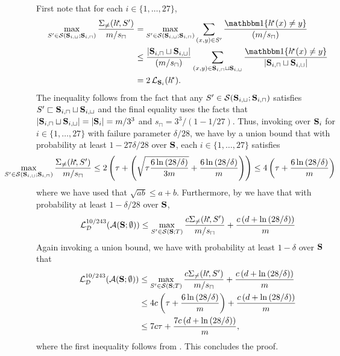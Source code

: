 \begin{proofof}{}
First note that for each $i \in\{ 1,\ldots,27\}$, 
\begin{align*}
\max\limits_{S'\in \cS(\rS_{i,\sqcup}; \rS_{i,\sqcap})} \frac{\Sigma_{\not=}(\hs\negmedspace,S')}{m/s_{\sqcap}} & =\max\limits_{S'\in \cS(\rS_{i,\sqcup};\rS_{i,\sqcap})} \sum\limits_{(x,y)\in S'}\frac{\ind\{ \hs(x)\not=y \}}{(m/s_{\sqcap})} \\
&\leq \frac{|\rS_{i,\sqcap}\sqcup\rS_{i,\sqcup}|}{(m/s_{\sqcap})}
\sum_{(x,y)\in \rS_{i,\sqcap}\sqcup\rS_{i,\sqcup}}\frac{\ind\{ \hs(x)\not=y \}}{|\rS_{i,\sqcap}\sqcup  \rS_{i,\sqcup}|} \\ 
&= 2\ls_{\rS_{i}}(\hs). 
\end{align*}
The inequality follows from the fact that any $S'\in \mathcal{S}(\mathbf{S}_{i,\sqcup};\mathbf{S}_{i,\sqcap})$ satisfies $S'\sqsubset \mathbf{S}_{i,\sqcap}\sqcup \mathbf{S}_{i,\sqcup}$ and the final equality uses the facts that $ |\mathbf{S}_{i,\sqcap}\sqcup\mathbf{S}_{i,\sqcup}|=|\mathbf{S}_{i}|=m/3^{3}$ and $ s_{\sqcap}=3^{3}/(1-1/27) $.  
Thus, invoking  over $\mathbf{S}_{i}  $ for $ i\in\{  1,\ldots,27\}  $ with failure parameter $  \delta/28$, we have by a union bound that with probability at least $ 1-27\delta/28 $ over $ \mathbf{S} $, each $ i\in\{  1,\ldots,27\}$ satisfies
\begin{align}\label{eq:upperboundlem1}
\hspace{-1.5 cm}
    \max\limits_{S'\in \cS(\rS_{i,\sqcup};\rS_{i,\sqcap})}\frac{\Sigma_{\not=}(\hs\negmedspace,S')}{m/s_{\sqcap}}
 \leq  
2
 \left(
    \tau+
 \left(\sqrt{\tau\frac{6\ln{(28/\delta )}}{3m}}
 +\frac{6\ln{(28/\delta )}}{m}\right)
 \right)\leq 4 \left(
    \tau+\frac{6\ln{(28/\delta )}}{m}\right)
\end{align}
where we have used that $ \sqrt{ab}\leq a+b.$ 
Furthermore, by  we have that with probability at least $ 1-\delta/28 $ over $ \mathbf{S} $, 
\begin{align*}
   \operatorname{\mathcal{L}}_{\mathcal{D}}^{10/243}(\mathcal{A}(\mathbf{S};\emptyset))\leq\max\limits_{S'\in\mathcal{S}(\mathbf{S};T)}\frac{c\Sigma_{\not=}(h^{\negmedspace\star}\negmedspace,S')}{m/s_{\sqcap}}+\frac{c\left(d+\ln{(28/\delta )}\right)}{m}
\end{align*}
Again invoking a union bound, we have with probability at least $ 1-\delta $ over $ \mathbf{S} $ that  
\begin{align*}
\operatorname{\mathcal{L}}_{\mathcal{D}}^{10/243}(\mathcal{A}(\mathbf{S};\emptyset)) &\leq \max\limits_{S'\in\mathcal{S}(\mathbf{S};T)}\frac{c\Sigma_{\not=}(h^{\negmedspace\star}\negmedspace,S')}{m/s_{\sqcap}}+\frac{c\left(d+\ln{(28/\delta )}\right)}{m}
\\
&\leq 
4 c\left(
    \tau+\frac{6\ln{(28/\delta )}}{m}\right)+\frac{c\left(d+\ln{(28/\delta )}\right)}{m}
    \\
&\leq 7c\tau+\frac{7c\left(d+\ln{(28/\delta )}\right)}{m},
\end{align*}
where the first inequality follows from . This concludes the proof. 
\end{proofof}

